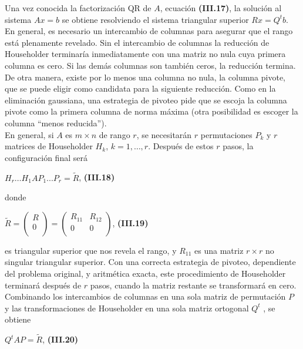 \documentclass[twocolumn,twoside]{article}
\begin{document}
Una vez conocida la factorizaci\'on QR de $A$, ecuaci\'on \textbf{(III.17)}, la soluci\'on al sistema
$A x = b$ se obtiene resolviendo el sistema triangular superior $R x = Q^t b$.\\
En general, es necesario un intercambio de columnas para asegurar que el rango
est\'a plenamente revelado. Sin el intercambio de columnas la reducci\'on de Householder
terminar\'ia inmediatamente con una matriz no nula cuya primera columna es cero. Si las
dem\'as columnas son tambi\'en ceros, la reducci\'on termina. De otra manera, existe por
lo menos una columna no nula, la columna pivote, que se puede eligir como candidata
para la siguiente reducci\'on. Como en la eliminaci\'on gaussiana, una estrategia de pivoteo
pide que se escoja la columna pivote como la primera columna de norma m\'axima (otra
posibilidad es escoger la columna “menos reducida”).\\
En general, si $A$ es $m\times n$ de rango $r$, se necesitar\'an $r$ permutaciones ${P_k}$ y $r$
matrices de Householder ${H_k}$, $k = 1,\dots , r$. Despu\'es de estos $r$ pasos, la configuraci\'on
final ser\'a  
\begin{center}
  $H_r \dots H_1 A P_1 . . . P_r = \tilde{R} $, \hspace{1cm}\textbf{(III.18)}
\end{center}
donde
\begin{center}
  $\tilde{R} =
  \left(\begin{array}{c}
  R\\ 
  0\\
 \end{array}\right)=
 \left(\begin{array}{cc}
  R_{11}& R_{12}\\ 
  0 & 0\\
 \end{array}\right)
 $, \hspace{0.5cm}\textbf{(III.19)}
\end{center}
es triangular superior que nos revela el rango, y $R_{11}$ es una matriz $ r\times r$ no singular
triangular superior. Con una correcta estrategia de pivoteo, dependiente del problema
original, y aritm\'etica exacta, este procedimiento de Householder terminar\'a despu\'es de $r$
pasos, cuando la matriz restante se transformar\'a en cero. Combinando los intercambios
de columnas en una sola matriz de permutaci\'on $P$ y las transformaciones de Householder
en una sola matriz ortogonal $Q^t$ , se obtiene
\begin{center}
  $Q^t A P = \tilde{R} $, \hspace{2cm}\textbf{(III.20)}
\end{center}
\end{document}

